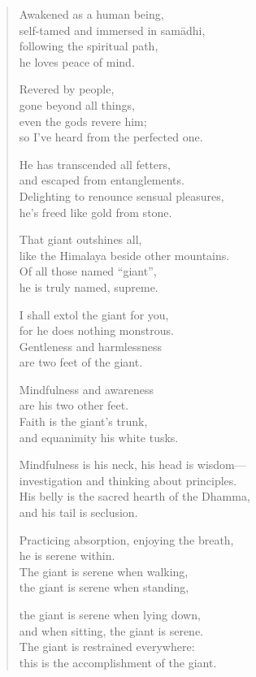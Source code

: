 \documentclass[12pt,openany]{book}%
\begin{document}
\begin{verse}%
Awakened as a human being, \\
self-tamed and immersed in \textsanskrit{samādhi}, \\
following the spiritual path, \\
he loves peace of mind. 

Revered by people, \\
gone beyond all things, \\
even the gods revere him; \\
so I’ve heard from the perfected one. 

He has transcended all fetters, \\
and escaped from entanglements. \\
Delighting to renounce sensual pleasures, \\
he’s freed like gold from stone. 

That giant outshines all, \\
like the Himalaya beside other mountains. \\
Of all those named “giant”, \\
he is truly named, supreme. 

I shall extol the giant for you, \\
for he does nothing monstrous. \\
Gentleness and harmlessness \\
are two feet of the giant. 

Mindfulness and awareness \\
are his two other feet. \\
Faith is the giant’s trunk, \\
and equanimity his white tusks. 

Mindfulness is his neck, his head is wisdom—\\
investigation and thinking about principles. \\
His belly is the sacred hearth of the Dhamma, \\
and his tail is seclusion. 

Practicing absorption, enjoying the breath, \\
he is serene within. \\
The giant is serene when walking, \\
the giant is serene when standing, 

the giant is serene when lying down, \\
and when sitting, the giant is serene. \\
The giant is restrained everywhere: \\
this is the accomplishment of the giant. 


\end{verse}
\end{document}
